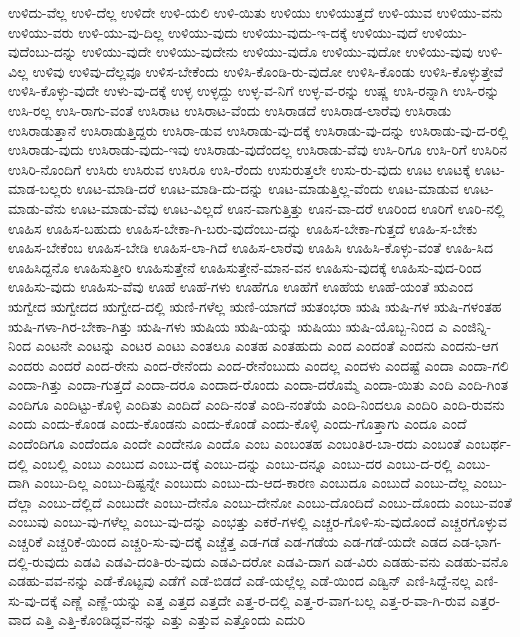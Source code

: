 {ಉಳಿದು-ವೆಲ್ಲ
ಉಳಿ-ದೆಲ್ಲ
ಉಳಿದೇ
ಉಳಿ-ಯಲಿ
ಉಳಿ-ಯಿತು
ಉಳಿಯು
ಉಳಿಯುತ್ತದೆ
ಉಳಿ-ಯುವ
ಉಳಿಯು-ವನು
ಉಳಿಯು-ವರು
ಉಳಿ-ಯು-ವು-ದಿಲ್ಲ
ಉಳಿಯು-ವುದು
ಉಳಿಯು-ವುದು-ಇ-ದಕ್ಕೆ
ಉಳಿಯು-ವುದೆ
ಉಳಿಯು-ವುದೆಂಬು-ದನ್ನು
ಉಳಿಯು-ವುದೇ
ಉಳಿಯು-ವುದೇನು
ಉಳಿಯು-ವುದೊ
ಉಳಿಯು-ವುದೋ
ಉಳಿಯು-ವುವು
ಉಳಿ-ವಿಲ್ಲ
ಉಳಿವು
ಉಳಿವು-ದೆಲ್ಲವೂ
ಉಳಿಸ-ಬೇಕೆಂದು
ಉಳಿಸಿ-ಕೊಂಡಿ-ರು-ವುದೋ
ಉಳಿಸಿ-ಕೊಂಡು
ಉಳಿಸಿ-ಕೊಳ್ಳುತ್ತೇವೆ
ಉಳಿಸಿ-ಕೊಳ್ಳು-ವುದೇ
ಉಳು-ವು-ದಕ್ಕೆ
ಉಳ್ಳ
ಉಳ್ಳದ್ದು
ಉಳ್ಳ-ವ-ನಿಗೆ
ಉಳ್ಳ-ವ-ರನ್ನು
ಉಷ್ಣ
ಉಸಿ-ರನ್ನಾಗಿ
ಉಸಿ-ರನ್ನು
ಉಸಿ-ರಲ್ಲ
ಉಸಿ-ರಾಗು-ವಂತೆ
ಉಸಿರಾಟ
ಉಸಿರಾಟ-ವೆಂದು
ಉಸಿರಾಡದೆ
ಉಸಿರಾಡ-ಲಾರೆವು
ಉಸಿರಾಡು
ಉಸಿರಾಡುತ್ತಾನೆ
ಉಸಿರಾಡುತ್ತಿದ್ದರು
ಉಸಿರಾ-ಡುವ
ಉಸಿರಾಡು-ವು-ದಕ್ಕೆ
ಉಸಿರಾಡು-ವು-ದನ್ನು
ಉಸಿರಾಡು-ವು-ದ-ರಲ್ಲಿ
ಉಸಿರಾಡು-ವುದು
ಉಸಿರಾಡು-ವುದು-ಇವು
ಉಸಿರಾಡು-ವುದೆಂದಲ್ಲ
ಉಸಿರಾಡು-ವೆವು
ಉಸಿ-ರಿಗೂ
ಉಸಿ-ರಿಗೆ
ಉಸಿರಿನ
ಉಸಿರಿ-ನೊಂದಿಗೆ
ಉಸಿರು
ಉಸಿರುವ
ಉಸಿರೂ
ಉಸಿ-ರೆಂದು
ಉಸುರುತ್ತಲೇ
ಉಸು-ರು-ವುದು
ಊಟ
ಊಟಕ್ಕೆ
ಊಟ-ಮಾಡ-ಬಲ್ಲರು
ಊಟ-ಮಾಡಿ-ದರೆ
ಊಟ-ಮಾಡಿ-ದು-ದನ್ನು
ಊಟ-ಮಾಡುತ್ತಿಲ್ಲ-ವೆಂದು
ಊಟ-ಮಾಡುವ
ಊಟ-ಮಾಡು-ವೆನು
ಊಟ-ಮಾಡು-ವೆವು
ಊಟ-ವಿಲ್ಲದೆ
ಊನ-ವಾಗುತ್ತಿತ್ತು
ಊನ-ವಾ-ದರೆ
ಊರಿಂದ
ಊರಿಗೆ
ಊರಿ-ನಲ್ಲಿ
ಊಹಿಸ
ಊಹಿಸ-ಬಹುದು
ಊಹಿಸ-ಬೇಕಾ-ಗಿ-ಬರು-ವುದೆಂಬು-ದನ್ನು
ಊಹಿಸ-ಬೇಕಾ-ಗುತ್ತದೆ
ಊಹಿ-ಸ-ಬೇಕು
ಊಹಿಸ-ಬೇಕೆಂಬ
ಊಹಿಸ-ಬೇಡಿ
ಊಹಿಸ-ಲಾ-ಗಿದೆ
ಊಹಿಸ-ಲಾರೆವು
ಊಹಿಸಿ
ಊಹಿಸಿ-ಕೊಳ್ಳು-ವಂತೆ
ಊಹಿ-ಸಿದ
ಊಹಿಸಿದ್ದನೊ
ಊಹಿಸುತ್ತೀರಿ
ಊಹಿಸುತ್ತೇನೆ
ಊಹಿಸುತ್ತೇನೆ-ಮಾನ-ವನ
ಊಹಿಸು-ವುದಕ್ಕೆ
ಊಹಿಸು-ವುದ-ರಿಂದ
ಊಹಿಸು-ವುದು
ಊಹಿಸು-ವೆವು
ಊಹೆ
ಊಹೆ-ಗಳು
ಊಹೆಗೂ
ಊಹೆಗೆ
ಊಹೆಯ
ಊಹೆ-ಯಂತೆ
ಋಎಂದ
ಋಗ್ವೇದ
ಋಗ್ವೇದದ
ಋಗ್ವೇದ-ದಲ್ಲಿ
ಋಣಿ-ಗಳೆಲ್ಲ
ಋಣಿ-ಯಾಗದೆ
ಋತಂಭರಾ
ಋಷಿ
ಋಷಿ-ಗಳ
ಋಷಿ-ಗಳಂತಹ
ಋಷಿ-ಗಳಾ-ಗಿರ-ಬೇಕಾ-ಗಿತ್ತು
ಋಷಿ-ಗಳು
ಋಷಿಯ
ಋಷಿ-ಯನ್ನು
ಋಷಿಯು
ಋಷಿ-ಯೊಬ್ಬ-ನಿಂದ
ಎ
ಎಂಜಿನ್ನಿ-ನಿಂದ
ಎಂಟನೇ
ಎಂಟನ್ನು
ಎಂಟರ
ಎಂಟು
ಎಂತಲೂ
ಎಂತಹ
ಎಂತಹುದು
ಎಂದ
ಎಂದಂತೆ
ಎಂದನು
ಎಂದನು-ಆಗ
ಎಂದರು
ಎಂದರೆ
ಎಂದ-ರೇನು
ಎಂದ-ರೇನೆಂದು
ಎಂದ-ರೇನೆಂಬುದು
ಎಂದಲ್ಲ
ಎಂದಳು
ಎಂದಷ್ಟೆ
ಎಂದಾ
ಎಂದಾ-ಗಲಿ
ಎಂದಾ-ಗಿತ್ತು
ಎಂದಾ-ಗುತ್ತದೆ
ಎಂದಾ-ದರೂ
ಎಂದಾದ-ರೊಂದು
ಎಂದಾ-ದರೊಮ್ಮೆ
ಎಂದಾ-ಯಿತು
ಎಂದಿ
ಎಂದಿ-ಗಿಂತ
ಎಂದಿಗೂ
ಎಂದಿಟ್ಟು-ಕೊಳ್ಳಿ
ಎಂದಿತು
ಎಂದಿದೆ
ಎಂದಿ-ನಂತೆ
ಎಂದಿ-ನಂತೆಯೆ
ಎಂದಿ-ನಿಂದಲೂ
ಎಂದಿರಿ
ಎಂದಿ-ರುವನು
ಎಂದು
ಎಂದು-ಕೊಂಡ
ಎಂದು-ಕೊಂಡನು
ಎಂದು-ಕೊಂಡೆ
ಎಂದು-ಕೊಳ್ಳಿ
ಎಂದು-ಗೊತ್ತಾಗು
ಎಂದೂ
ಎಂದೆ
ಎಂದೆಂದಿಗೂ
ಎಂದೆಂದೂ
ಎಂದೇ
ಎಂದೇನೂ
ಎಂದೊ
ಎಂಬ
ಎಂಬಂತಹ
ಎಂಬಂತಿರ-ಬಾ-ರದು
ಎಂಬಂತೆ
ಎಂಬರ್ಥ-ದಲ್ಲಿ
ಎಂಬಲ್ಲಿ
ಎಂಬು
ಎಂಬುದ
ಎಂಬು-ದಕ್ಕೆ
ಎಂಬು-ದನ್ನು
ಎಂಬು-ದನ್ನೂ
ಎಂಬು-ದರ
ಎಂಬು-ದ-ರಲ್ಲಿ
ಎಂಬು-ದಾಗಿ
ಎಂಬು-ದಿಲ್ಲ
ಎಂಬು-ದಿಷ್ಟನ್ನೇ
ಎಂಬುದು
ಎಂಬು-ದು-ಆದ-ಕಾರಣ
ಎಂಬುದೂ
ಎಂಬುದೆ
ಎಂಬು-ದೆಲ್ಲ
ಎಂಬು-ದೆಲ್ಲಾ
ಎಂಬು-ದೆಲ್ಲಿದೆ
ಎಂಬುದೇ
ಎಂಬು-ದೇನೊ
ಎಂಬು-ದೇನೋ
ಎಂಬು-ದೊಂದಿದೆ
ಎಂಬು-ದೊಂದು
ಎಂಬು-ವಂತೆ
ಎಂಬುವು
ಎಂಬು-ವು-ಗಳೆಲ್ಲ
ಎಂಬು-ವು-ದನ್ನು
ಎಂಭತ್ತು
ಎಕರೆ-ಗಳಲ್ಲಿ
ಎಚ್ಚರ-ಗೊಳಿ-ಸು-ವುದೊಂದೆ
ಎಚ್ಚರಗೊಳ್ಳುವ
ಎಚ್ಚರಿಕೆ
ಎಚ್ಚರಿಕೆ-ಯಿಂದ
ಎಚ್ಚರಿ-ಸು-ವು-ದಕ್ಕೆ
ಎಚ್ಚೆತ್ತ
ಎಡ-ಗಡೆ
ಎಡ-ಗಡೆಯ
ಎಡ-ಗಡೆ-ಯದೇ
ಎಡದ
ಎಡ-ಭಾಗ-ದಲ್ಲಿ-ರುವುದು
ಎಡವಿ
ಎಡವಿ-ದಂತಿ-ರು-ವುದು
ಎಡವಿ-ದರೋ
ಎಡವಿ-ದಾಗ
ಎಡ-ವಿರು
ಎಡಹು-ವನು
ಎಡಹು-ವನೊ
ಎಡಹು-ವವ-ನನ್ನು
ಎಡೆ-ಕೊಟ್ಟವು
ಎಡೆಗೆ
ಎಡೆ-ಬಿಡದೆ
ಎಡೆ-ಯಲ್ಲೆಲ್ಲ
ಎಡೆ-ಯಿಂದ
ಎಡ್ವಿನ್
ಎಣಿ-ಸಿದ್ದೆ-ನಲ್ಲ
ಎಣಿ-ಸು-ವು-ದಕ್ಕೆ
ಎಣ್ಣೆ
ಎಣ್ಣೆ-ಯನ್ನು
ಎತ್ತ
ಎತ್ತದ
ಎತ್ತದೇ
ಎತ್ತ-ರ-ದಲ್ಲಿ
ಎತ್ತ-ರ-ವಾಗ-ಬಲ್ಲ
ಎತ್ತ-ರ-ವಾ-ಗಿ-ರುವ
ಎತ್ತರ-ವಾದ
ಎತ್ತಿ
ಎತ್ತಿ-ಕೊಂಡಿದ್ದವ-ನನ್ನು
ಎತ್ತು
ಎತ್ತುವ
ಎತ್ತೊಂದು
ಎದುರಿ
}
